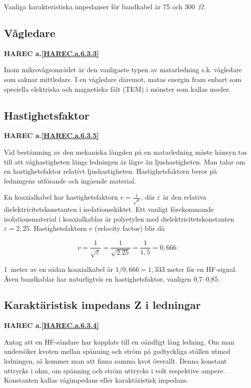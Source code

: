 Vanliga karakteristiska impedanser för bandkabel är 75 och 300~\(\Omega\).

\subsection{Vågledare}
\textbf{
HAREC a.\ref{HAREC.a.6.3.3}\label{myHAREC.a.6.3.3}
}

Inom mikrovågsområdet är den vanligaste typen av matarledning
s.k. vågledare som saknar mittledare.
I en vågledare däremot, matas energin fram enbart som speciella elektriska och
magnetiska fält (TEM) i mönster som kallas moder.

\subsection{Hastighetsfaktor}
\textbf{
HAREC a.\ref{HAREC.a.6.3.5}\label{myHAREC.a.6.3.5}
}

Vid bestämning av den mekaniska längden på en matarledning måste
hänsyn tas till att våghastigheten längs ledningen är lägre än ljushastigheten.
Man talar om en hastighetsfaktor relativt ljushastigheten.
Hastighetsfaktorn beror på ledningens utförande och ingående material.

En koaxialkabel har hastighetsfaktorn \(v = \frac{1}{\sqrt{\varepsilon}}\),
där \(\varepsilon\) är den relativa dielektricitetskonstanten i
isolationsskiktet.
Ett vanligt förekommande isolationsmaterial i koaxialkablar är polyetylen med
dielektricitetskonstanten \(\varepsilon = 2,25\).
Hastighetsfaktorn \(v\) (velocity factor) blir då

\[
v = \frac{1}{\sqrt{\varepsilon}} = \frac{1}{\sqrt{2.25}} = \frac{1}{1,5} = 0,666
\]

1~meter av en sådan koaxialkabel är \(1/0,666 = 1,333\) meter för en HF-signal.
Även bandkablar har naturligtvis en hastighetsfaktor, vanligen 0,7--0,85.

\subsection{Karaktäristisk impedans Z i ledningar}
\textbf{
HAREC a.\ref{HAREC.a.6.3.4}\label{myHAREC.a.6.3.4}
}

Antag att en HF-sändare har kopplats till en oändligt lång ledning.
Om man undersöker kvoten mellan spänning och ström på godtyckliga ställen
utmed ledningen, så kommer man att finna samma kvot överallt.
Denna konstant uttrycks i ohm, om spänning och ström uttrycks i volt
respektive ampere.
Konstanten kallas vågimpedans eller karaktäristisk impedans.

